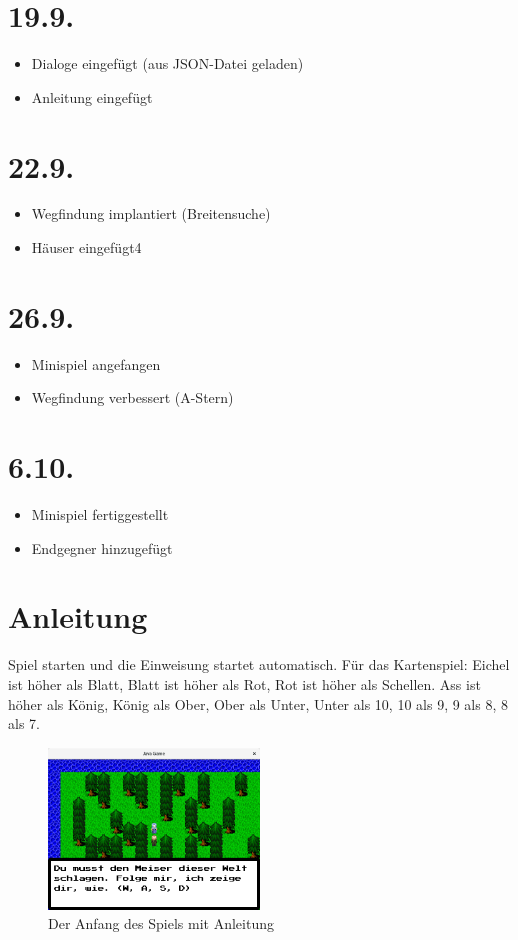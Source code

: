 \documentclass{scrreprt}
\begin{document}
	\section*{19.9.}
	\begin{itemize}
		\item Dialoge eingefügt (aus JSON-Datei geladen)
		\item Anleitung eingefügt
	\end{itemize}

	\section*{22.9.}
	\begin{itemize}
		\item Wegfindung implantiert (Breitensuche)
		\item Häuser eingefügt4
	\end{itemize}

	\section*{26.9.}
	\begin{itemize}
		\item Minispiel angefangen
		\item Wegfindung verbessert (A-Stern)
	\end{itemize}

	\section*{6.10.}
	\begin{itemize}
		\item Minispiel fertiggestellt
		\item Endgegner hinzugefügt
	\end{itemize}

	\section*{Anleitung}
	Spiel starten und die Einweisung startet automatisch. Für das Kartenspiel: Eichel ist höher als Blatt, Blatt ist höher als Rot, Rot ist höher als Schellen. Ass ist höher als König, König als Ober, Ober als Unter, Unter als 10, 10 als 9, 9 als 8, 8 als 7.
	
	\begin{figure}
		\centering
		\includegraphics[width=0.5\textwidth]{ingame.png}
		\caption{Der Anfang des Spiels mit Anleitung}
	\end{figure}
\end{document}
